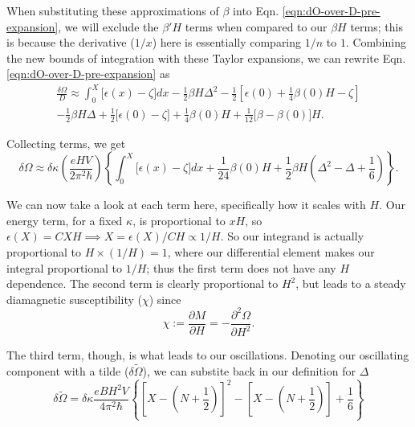 \documentclass[12pt]{revtex4-2}
\begin{document}
When substituting these approximations of $\beta$ into Eqn. \ref{eqn:dO-over-D-pre-expansion}, we will exclude the $\beta'H$ terms when compared to our $\beta H$ terms; this is because the derivative ($1/x$) here is essentially comparing $1/n$ to $1$.  Combining the new bounds of integration with these Taylor expansions, we can rewrite Eqn. \ref{eqn:dO-over-D-pre-expansion} as 
\begin{multline}
    \frac{\delta\Omega}{D} \approx \int_0^X \big[\epsilon(x)-\zeta\big]dx  - \frac{1}{2}\beta H \Delta^2 - \frac{1}{2}\left[ \epsilon(0) + \frac{1}{4}\beta(0)H - \zeta \right] \\
     - \frac{1}{2}\beta H\Delta + \frac{1}{2}\big[\epsilon(0)-\zeta\big] + \frac{1}{4}\beta(0)H + \frac{1}{12}\big[ \beta - \beta(0) \big]H.
\end{multline}

Collecting terms, we get 
\begin{equation}
    \delta \Omega \approx \delta\kappa\left( \frac{eHV}{2\pi^2\hbar} \right)\left\{ \int_0^X \big[\epsilon(x)-\zeta\big]dx + \frac{1}{24}\beta(0)H + \frac{1}{2}\beta H\left( \Delta^2 - \Delta + \frac{1}{6} \right) \right\}.
\end{equation}

We can now take a look at each term here, specifically how it scales with $H$.  Our energy term, for a fixed $\kappa$, is proportional to $xH$, so $\epsilon(X) = CXH \implies X = \epsilon(X)/CH \propto 1/H$.  So our integrand is actually proportional to $H\times(1/H)=1$, where our differential element makes our integral proportional to $1/H$; thus the first term does not have any $H$ dependence.  The second term is clearly proportional to $H^2$, but leads to a steady diamagnetic susceptibility ($\chi$) since
\begin{equation}
    \chi := \frac{\partial M}{\partial H} = -\frac{\partial^2\Omega}{\partial H^2}.
\end{equation}

The third term, though, is what leads to our oscillations.  Denoting our oscillating component with a tilde ($\delta\tilde{\Omega}$), we can substite back in our definition for $\Delta$
\begin{equation}\label{eqn:potential-step}
    \boxed{\delta\tilde{\Omega} = \delta \kappa \frac{eBH^2V}{4\pi^2\hbar} \left\{ \left[ X - \left( N + \frac{1}{2} \right)\right]^2 - \left[ X - \left( N + \frac{1}{2} \right)\right] + \frac{1}{6} \right\}}
\end{equation}
\end{document}
